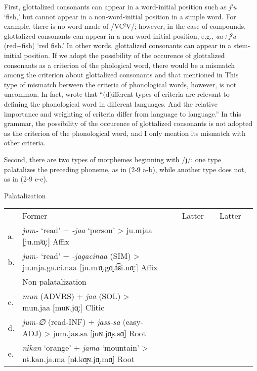 First, glottalized consonants can appear in a word-initial position such as \textit{jˀu} ‘fish,’ but cannot appear in a non-word-initial position in a simple word. For example, there is no word made of /VCˀV/; however, in the case of compounds, glottalized consonants can appear in a non-word-initial position, e.g., \textit{aa+jˀu} (red+fish) ‘red fish.’ In other words, glottalized consonants can appear in a stem-initial position. If we adopt the possibility of the occurence of glottalized consonants as a criterion of the phological word, there would be a mismatch among the criterion about glottalized consonants and that mentioned in  This type of mismatch between the criteria of phonological words, however, is not uncommon. In fact, \citet[18]{DixonAikhenvald2002} wrote that “(d)ifferent types of criteria are relevant to defining the phonological word in different languages. And the relative importance and weighting of criteria differ from language to language.” In this grammar, the possibility of the occurence of glottalized consonants is not adopted as the criterion of the phonological word, and I only mention its mismatch with other criteria.

Second, there are two types of morphemes beginning with /j/: one type palatalizes the preceding phoneme, as in (2-9 a-b), while another type does not, as in (2-9 c-e).

\ea Palatalization\\
\begin{tabular}{lllllllll}
   &   \multicolumn{2}{l}{Former}  & &  \multicolumn{2}{l}{Latter}   & &   {Latter}\\
a. & {\itshape jum-}  {‘read’}  {+}  {\itshape {}-jaa}  {‘person’}  {>}  {ju.mjaa [ju.mʲɑ̟ː]}  {Affix}\\
b. & {\itshape jum-}  {‘read’}  {+}  {\itshape {}-jagacinaa}  {(SIM)}  {>}  {ju.mja.ga.ci.naa [ju.mʲɑ̟.gɑ̟.t͡ɕi.nɑ̟ː]}  {Affix}\medskip\\
   & \multicolumn{3}{l}{Non-palatalization} \\
c. & {\itshape mun}  {(ADVRS)}  {+}  {\itshape jaa}  {(SOL)}  {>}  {mun.jaa [muɴ.jɑ̟ː]}  {Clitic}\\
d. & {\itshape jum-∅}  {(read-INF)}  {+}  {\itshape jass-sa}  {(easy-ADJ)}  {>}  {jum.jas.sa [juɴ.jɑ̟s.sɑ̟]}  {Root}\\
e. & {\itshape nɨkan}  {‘orange’}  {+}  {\itshape jama}  {‘mountain’}  {>}  {nɨ.kan.ja.ma [nɨ.kɑ̟ɴ.jɑ̟.mɑ̟]}  {Root}\\
\end{tabular}
\z

